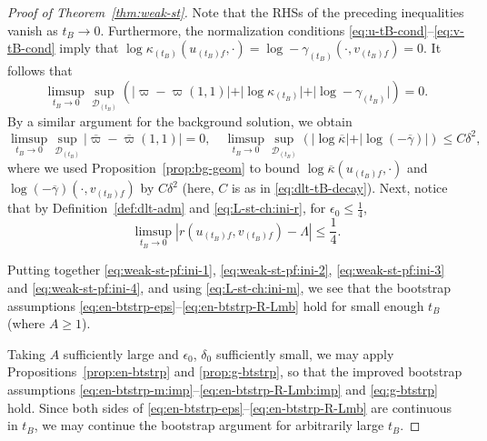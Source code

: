 \documentclass[10pt, reqno]{amsart}
\theoremstyle{definition}
\theoremstyle{remark}
\theoremstyle{conjecture}
\numberwithin{equation}{section}
\newcommand{\abs}[1]{\vert#1\vert}
\newcommand{\ep}{\epsilon}
\newcommand{\0}{\emptyset}
\newcommand{\gmm}{\gamma}
\newcommand{\dlt}{\delta}
\newcommand{\eps}{\epsilon}
\newcommand{\kpp}{\kappa}
\newcommand{\lmb}{\lambda}
\newcommand{\calD}{\mathcal D}
\newcommand{\dur}{\nu}
\newcommand{\dvr}{\lmb}
\newcommand{\f}{\frac}
\newcommand{\varpibg}{\overline{\varpi}}				%
\newcommand{\kppbg}{\overline{\kpp}}					%
\newcommand{\gmmbg}{\overline{\gmm}}					%
\begin{document}
\begin{proof}[Proof of Theorem~\ref{thm:weak-st}]
Note that the RHSs of the preceding inequalities vanish as $t_{B} \to 0$. Furthermore, the normalization conditions \eqref{eq:u-tB-cond}--\eqref{eq:v-tB-cond} imply that $\log \kpp_{(t_{B})} (u_{(t_{B}) f}, \cdot) = \log -\gmm_{(t_{B})} (\cdot, v_{(t_{B})f}) = 0$. It follows that
\begin{equation} \label{eq:weak-st-pf:ini-2}
	\limsup_{t_{B} \to 0}  \sup_{\calD_{(t_{B})}} \left( \abs{\varpi - \varpi(1,1)} + \abs{\log \kpp_{(t_{B})}} + \abs{\log -\gmm_{(t_{B})}} \right) = 0.
\end{equation}
By a similar argument for the background solution, we obtain
\begin{equation} \label{eq:weak-st-pf:ini-3}
	\limsup_{t_{B} \to 0} \sup_{\calD_{(t_{B})}} \abs{\varpibg - \varpibg(1,1)} = 0, \quad
	\limsup_{t_{B} \to 0}  \sup_{\calD_{(t_{B})}} \left(\abs{\log \kppbg} + \abs{\log (-\gmmbg)} \right) \leq C \dlt^{2},
\end{equation}
where we used Proposition~\ref{prop:bg-geom} to bound $\log \kppbg(u_{(t_{B}) f}, \cdot)$ and $\log (-\gmmbg)(\cdot, v_{(t_{B}) f})$ by $C \dlt^{2}$ (here, $C$ is as in \eqref{eq:dlt-tB-decay}). Next, notice that by Definition~\ref{def:dlt-adm} and \eqref{eq:L-st-ch:ini-r}, for $\ep_0\leq \f 14$,
\begin{equation} \label{eq:weak-st-pf:ini-4}
 \limsup_{t_{B} \to 0} |r(u_{(t_B)f}, v_{(t_B)f})-\Lambda| \leq \f 14.
\end{equation}

Putting together \eqref{eq:weak-st-pf:ini-1}, \eqref{eq:weak-st-pf:ini-2}, \eqref{eq:weak-st-pf:ini-3} and \eqref{eq:weak-st-pf:ini-4}, and using \eqref{eq:L-st-ch:ini-m}, we see that the bootstrap assumptions \eqref{eq:en-btstrp-eps}--\eqref{eq:en-btstrp-R-Lmb} hold for small enough $t_{B}$ (where $A \geq 1$).

Taking $A$ sufficiently large and $\eps_{0}$, $\dlt_{0}$ sufficiently small, we may apply Propositions~\ref{prop:en-btstrp} and \ref{prop:g-btstrp}, so that the improved bootstrap assumptions \eqref{eq:en-btstrp-m:imp}--\eqref{eq:en-btstrp-R-Lmb:imp} and \eqref{eq:g-btstrp} hold. Since both sides of \eqref{eq:en-btstrp-eps}--\eqref{eq:en-btstrp-R-Lmb} are continuous in $t_{B}$, we may continue the bootstrap argument for arbitrarily large $t_{B}$.


\end{proof}
\end{document}

